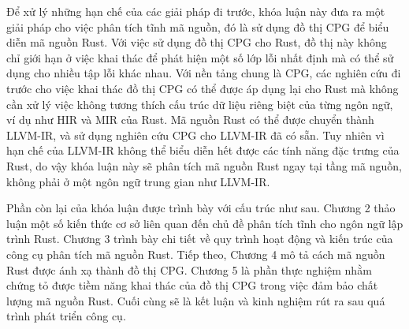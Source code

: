 
Để xử lý những hạn chế của các giải pháp đi trước, khóa luận này đưa ra một giải pháp cho việc phân tích tĩnh mã nguồn, đó là sử dụng đồ thị CPG để biểu diễn mã nguồn Rust.
Với việc sử dụng đồ thị CPG cho Rust, đồ thị này không chỉ giới hạn ở việc khai thác để phát hiện một số lớp lỗi nhất định mà có thể sử dụng cho nhiều tập lỗi khác nhau.
Với nền tảng chung là CPG, các nghiên cứu đi trước cho việc khai thác đồ thị CPG có thể được áp dụng lại cho Rust mà không cần xử lý việc không tương thích cấu trúc dữ liệu riêng biệt của từng ngôn ngữ, ví dụ như HIR và MIR của Rust.
Mã nguồn Rust có thể được chuyển thành LLVM-IR, và sử dụng nghiên cứu CPG cho LLVM-IR đã có sẵn.
Tuy nhiên vì hạn chế của LLVM-IR không thể biểu diễn hết được các tính năng đặc trưng của Rust, do vậy khóa luận này sẽ phân tích mã nguồn Rust ngay tại tầng mã nguồn, không phải ở một ngôn ngữ trung gian như LLVM-IR.

Phần còn lại của khóa luận được trình bày với cấu trúc như sau.
Chương 2 thảo luận một số kiến thức cơ sở liên quan đến chủ đề phân tích tĩnh cho ngôn ngữ lập trình Rust.
Chương 3 trình bày chi tiết về quy trình hoạt động và kiến trúc của công cụ phân tích mã nguồn Rust.
Tiếp theo, Chương 4 mô tả cách mã nguồn Rust được ánh xạ thành đồ thị CPG.
Chương 5 là phần thực nghiệm nhằm chứng tỏ được tiềm năng khai thác của đồ thị CPG trong việc đảm bảo chất lượng mã nguồn Rust.
Cuối cùng sẽ là kết luận và kinh nghiệm rút ra sau quá trình phát triển công cụ.
